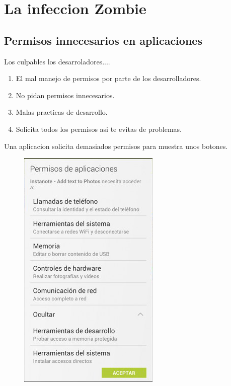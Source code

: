 \documentclass[12pt]{beamer} %
\begin{document}
\section{La infeccion Zombie}
\subsection{Permisos innecesarios en aplicaciones}
\begin{slide}
 Los culpables los desarroladores....
  \begin{enumerate}
    \item El mal manejo de permisos por parte de los desarrolladores.\pause
    \item No pidan permisos innecesarios.\pause
    \item Malas practicas de desarrollo.\pause
    \item Solicita todos los permisos asi te evitas de problemas.
  \end{enumerate}
\end{slide}

\begin{slide}
  Una aplicacion solicita demasiados permisos para muestra unos botones.
    \begin{figure}[h]
      \includegraphics[height=0.9\textheight]{img/permisos.png}
    \end{figure}
\end{slide}
\end{document}
